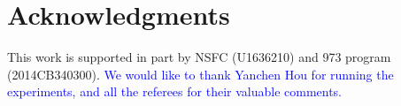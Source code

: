 \documentclass[twocolumn]{svjour3}          %
\begin{document}









\section*{Acknowledgments}
This work is supported in part by NSFC (U1636210) and 973 program ({2014CB340300}).
\textcolor{blue}{We would like to thank Yanchen Hou for running the experiments, and all the referees for their valuable comments.}


\balance







\end{document}
